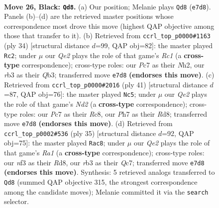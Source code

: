 \documentclass[11pt]{article}
\begin{document}
\clearpage

\begin{figure}[p]\centering
\begin{subfigure}{0.46\textwidth}\centering
\resizebox{\linewidth}{!}{%
\newchessgame
\chessboard[
  setfen={rn2r1k1/2pnq2p/1p2p1p1/p3Pp2/3P1P1P/PR3NN1/2PK2PQ/7R b - - 1 26},
  showmover=false,
  pgfstyle=straightmove, color=movearrow, markmove={e7-d8}
]}
\caption{}
\end{subfigure}\hfill
\begin{subfigure}{0.46\textwidth}\centering
\resizebox{\linewidth}{!}{%
\newchessgame
\chessboard[
  setfen={5r2/2pq1rpk/1pnppn1p/p3p3/P3P3/1QPPRN1P/1P3PPN/2R3K1 w - - 5 18},
  showmover=false,
  pgfstyle=straightmove, color=movearrow, markmove={c1-c2}
]}
\caption{}
\end{subfigure}
\\[4pt]
\begin{subfigure}{0.46\textwidth}\centering
\resizebox{\linewidth}{!}{%
\newchessgame
\chessboard[
  setfen={2rr2k1/2qn1pp1/pp1ppn1p/8/P1PNPP2/1PN3P1/2R1Q1KP/3R4 b - - 0 21},
  showmover=false,
  pgfstyle=straightmove, color=movearrow, markmove={d7-c5}
]}
\caption{}
\end{subfigure}\hfill
\begin{subfigure}{0.46\textwidth}\centering
\resizebox{\linewidth}{!}{%
\newchessgame
\chessboard[
  setfen={r2r2k1/2qn1pp1/pp1ppn1p/8/P1PNP3/1PN3P1/4QPKP/2RR4 b - - 2 18},
  showmover=false,
  pgfstyle=straightmove, color=movearrow, markmove={a8-c8}
]}
\caption{}
\end{subfigure}
\caption{\textbf{Move 26, Black: \texttt{Qd8}.} (a) Our position; Melanie plays \texttt{Qd8} (\texttt{e7d8}). Panels (b)--(d) are the retrieved master positions whose correspondence most drove this move (highest QAP objective among those that transfer to it). (b) Retrieved from \texttt{ccrl\_top\_p0000\#1163} (ply 34) [structural distance $d$=99, QAP obj=82]: the master played \texttt{Rc2}; under $\mu$ our \emph{Qe2} plays the role of that game's \emph{Rc1} (a \textbf{cross-type} correspondence); cross-type roles: our \emph{P}c7 as their \emph{N}h2, our \emph{r}b3 as their \emph{Q}b3; transferred move \texttt{e7d8} \textbf{(endorses this move)}. (c) Retrieved from \texttt{ccrl\_top\_p0000\#2016} (ply 41) [structural distance $d$=87, QAP obj=76]: the master played \texttt{Nc5}; under $\mu$ our \emph{Qe2} plays the role of that game's \emph{Nd2} (a \textbf{cross-type} correspondence); cross-type roles: our \emph{P}c7 as their \emph{R}c8, our \emph{P}h7 as their \emph{R}d8; transferred move \texttt{e7d8} \textbf{(endorses this move)}. (d) Retrieved from \texttt{ccrl\_top\_p0002\#536} (ply 35) [structural distance $d$=92, QAP obj=75]: the master played \texttt{Rac8}; under $\mu$ our \emph{Qe2} plays the role of that game's \emph{Ra1} (a \textbf{cross-type} correspondence); cross-type roles: our \emph{n}f3 as their \emph{R}d8, our \emph{r}b3 as their \emph{Q}c7; transferred move \texttt{e7d8} \textbf{(endorses this move)}. Synthesis: 5 retrieved analogs transferred to \texttt{Qd8} (summed QAP objective 315, the strongest correspondence among the candidate moves); Melanie committed it via the \texttt{search} selector.}
\label{fig:thought-m51}
\end{figure}
\end{document}
